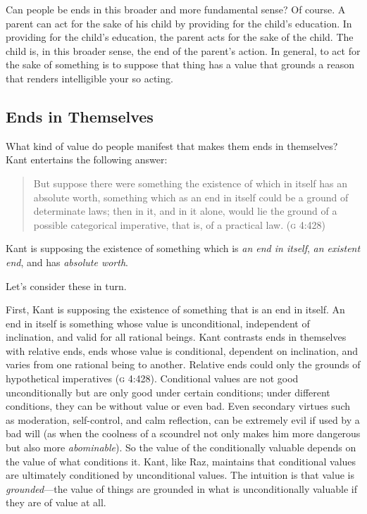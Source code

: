 \documentclass[a4paper,12pt]{article}
\begin{document}
Can people be ends in this broader and more fundamental sense? Of course. A parent can act for the sake of his child by providing for the child's education. In providing for the child's education, the parent acts for the sake of the child. The child is, in this broader sense, the end of the parent's action. In general, to act for the sake of something is to suppose that thing has a value that grounds a reason that renders intelligible your so acting.


\subsection{Ends in Themselves} \label{sub:ends_in_themselves} %

What kind of value do people manifest that makes them ends in themselves? Kant entertains the following answer: 
\begin{quote}
	But suppose there were something the existence of which in itself has an absolute worth, something which as an end in itself could be a ground of determinate laws; then in it, and in it alone, would lie the ground of a possible categorical imperative, that is, of a practical law. (\textsc{g} 4:428) 
\end{quote}
Kant is supposing the existence of something which is \emph{an end in itself}, \emph{an existent end}, and has \emph{absolute worth}. 

Let's consider these in turn.

First, Kant is supposing the existence of something that is an end in itself. An end in itself is something whose value is unconditional, independent of inclination, and valid for all rational beings. Kant contrasts ends in themselves with relative ends, ends whose value is conditional, dependent on inclination, and varies from one rational being to another. Relative ends could only the grounds of hypothetical imperatives (\textsc{g} 4:428). Conditional values are not good unconditionally but are only good under certain conditions; under different conditions, they can be without value or even bad. Even secondary virtues such as moderation, self-control, and calm reflection, can be extremely evil if used by a bad will (as when the coolness of a scoundrel not only makes him more dangerous but also more \emph{abominable}). So the value of the conditionally valuable depends on the value of what conditions it. Kant, like Raz, maintains that conditional values are ultimately conditioned by unconditional values. The intuition is that value is \emph{grounded}---the value of things are grounded in what is unconditionally valuable if they are of value at all. 
\end{document}
